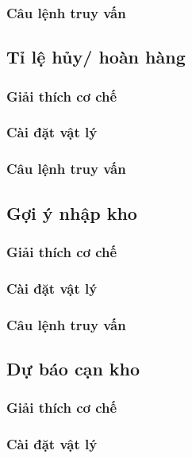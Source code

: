 \subsubsection{Câu lệnh truy vấn}

\subsection{Tỉ lệ hủy/ hoàn hàng}

\subsubsection{Giải thích cơ chế}

\subsubsection{Cài đặt vật lý}

\subsubsection{Câu lệnh truy vấn}

\subsection{Gợi ý nhập kho}

\subsubsection{Giải thích cơ chế}

\subsubsection{Cài đặt vật lý}

\subsubsection{Câu lệnh truy vấn}

\subsection{Dự báo cạn kho}

\subsubsection{Giải thích cơ chế}

\subsubsection{Cài đặt vật lý}

